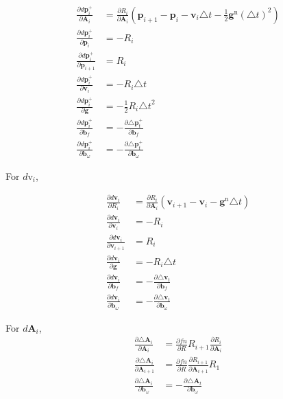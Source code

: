 \documentclass[12pt]{article}   %
\begin{document}
\begin{appendices}
\begin{align}
\frac{\partial d\textbf{p}^+_{i}}{\partial \textbf{A}_{i}} &= \frac{\partial R_i}{\partial \textbf{A}_i} ( \textbf{p}_{i+1} - \textbf{p}_i - \textbf{v}_i \triangle t - \frac{1}{2} \textbf{g}^{\mathrm{n}} {(\triangle t)}^2 ) \\
\frac{\partial d\textbf{p}^+_{i}}{\partial \textbf{p}_{i}} &= -R_i \\
\frac{\partial d\textbf{p}^+_{i}}{\partial \textbf{p}_{i+1}} &= R_i \\
\frac{\partial d\textbf{p}^+_{i}}{\partial \textbf{v}_{i}} &= -R_i \triangle t \\
\frac{\partial d\textbf{p}^+_{i}}{\partial \textbf{g}} &= -\frac{1}{2} R_i {\triangle t}^2 \\
\frac{\partial d\textbf{p}^+_{i}}{\partial \textbf{b}_f} &= - \frac{\partial \triangle \textbf{p}^+_t}{\partial \textbf{b}_f}\\
\frac{\partial d\textbf{p}^+_{i}}{\partial \textbf{b}_\omega} &= - \frac{\partial \triangle \textbf{p}^+_t}{\partial \textbf{b}_\omega}
\end{align}

For $d\text{v}_{i}$,

\begin{align}
\frac{\partial d\textbf{v}_{i}}{\partial R_{i}} &= \frac{\partial R_i}{\partial \textbf{A}_i} (\textbf{v}_{i+1} - \textbf{v}_i - \textbf{g}^{\mathrm{n}} \triangle t) \\
\frac{\partial d\textbf{v}_{i}}{\partial \textbf{v}_{i}} &= -R_i \\
\frac{\partial d\textbf{v}_{i}}{\partial \textbf{v}_{i+1}} &= R_i \\
\frac{\partial d\textbf{v}_{i}}{\partial \textbf{g}} &= -R_i \triangle t \\
\frac{\partial d\textbf{v}_{i}}{\partial \textbf{b}_f} &= - \frac{\partial \triangle \textbf{v}_t}{\partial \textbf{b}_f}\\
\frac{\partial d\textbf{v}_{i}}{\partial \textbf{b}_\omega} &= - \frac{\partial \triangle \textbf{v}_t}{\partial \textbf{b}_\omega}
\end{align}

For $d\textbf{A}_{i}$,
\begin{align}
\frac{\partial \triangle \textbf{A}_{i}}{\partial \textbf{A}_{i}} &= \frac{\partial fn}{\partial R} R_{i+1} \frac{\partial R_i}{\partial \textbf{A}_{i}}\\
\frac{\partial \triangle \textbf{A}_{i}}{\partial \textbf{A}_{i+1}} &= \frac{\partial fn}{\partial R} \frac{\partial R_{i+1}}{\partial \textbf{A}_{i+1}} R_{1} \\
\frac{\partial \triangle \textbf{A}_{i}}{\partial \textbf{b}_\omega} &= - \frac{\partial \triangle \textbf{A}_t}{\partial \textbf{b}_\omega}
\end{align}


\end{appendices}
\end{document}

